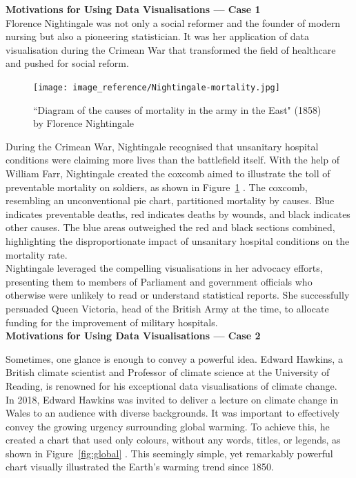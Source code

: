 \documentclass{article}\usepackage[]{graphicx}\usepackage[]{xcolor}
\numberwithin{equation}{section}
\begin{document}
\noindent \textbf{Motivations for Using Data Visualisations — Case 1}\\

\noindent
Florence Nightingale was not only a social reformer and the founder of modern nursing but also a pioneering statistician. It was her application of data visualisation during the Crimean War that transformed the field of healthcare and pushed for social reform.\\  

\begin{figure}[H]
    \centering
    \texttt{[image: image\_reference/Nightingale-mortality.jpg]}
    \caption{``Diagram of the causes of mortality in the army in the East" (1858) by Florence Nightingale}
    \label{fig:coxcomb}
\end{figure}


\noindent
During the Crimean War, Nightingale recognised that unsanitary hospital conditions were claiming more lives than the battlefield itself. With the help of William Farr, Nightingale created the coxcomb aimed to illustrate the toll of preventable mortality on soldiers, as shown in Figure~\ref{fig:coxcomb} \cite{graphFN}. The coxcomb, resembling an unconventional pie chart, partitioned mortality by causes. Blue indicates preventable deaths, red indicates deaths by wounds, and black indicates other causes. The blue areas outweighed the red and black sections combined, highlighting the disproportionate impact of unsanitary hospital conditions on the mortality rate.\\

\noindent
Nightingale leveraged the compelling visualisations in her advocacy efforts, presenting them to members of Parliament and government officials who otherwise were unlikely to read or understand statistical reports. She successfully persuaded Queen Victoria, head of the British Army at the time, to allocate funding for the improvement of military hospitals.\\

\noindent
\textbf{Motivations for Using Data Visualisations — Case 2}

\noindent
Sometimes, one glance is enough to convey a powerful idea. Edward Hawkins, a British climate scientist and Professor of climate science at the University of Reading, is renowned for his exceptional data visualisations of climate change.\\

\noindent
In 2018, Edward Hawkins was invited to deliver a lecture on climate change in Wales to an audience with diverse backgrounds. It was important to effectively convey the growing urgency surrounding global warming. To achieve this, he created a chart that used only colours, without any words, titles, or legends, as shown in Figure~\ref{fig:global} \cite{blog}. This seemingly simple, yet remarkably powerful chart visually illustrated the Earth's warming trend since 1850.
\end{document}
